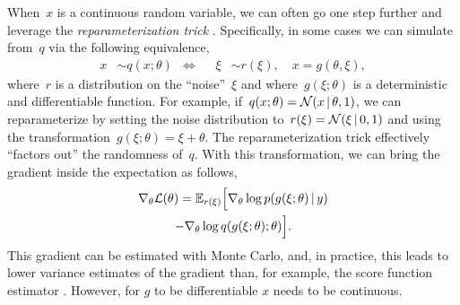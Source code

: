 \documentclass[twoside]{article}
\begin{document}
When~$x$ is a continuous random variable, we can often go one step
further and leverage the \emph{reparameterization trick}
\citep{Salimans2013, Kingma2014}.  Specifically, in some cases we can
simulate from~$q$ via the following equivalence,
\begin{align*}
  x &\sim q(x; \theta)
      & \iff & &  
  \xi &\sim r(\xi), \quad x = g(\theta, \xi),
\end{align*}
where~$r$ is a distribution on the ``noise''~$\xi$ and
where~$g(\xi; \theta)$ is a deterministic and differentiable
function. For example,
if~${q(x; \theta) = \mathcal{N}(x \, | \, \theta, 1)}$, we can
reparameterize by setting the noise distribution
to~${r(\xi) = \mathcal{N}(\xi \, | \, 0, 1)}$ and using the
transformation~${g(\xi; \theta) = \xi + \theta}$.  The
reparameterization trick effectively ``factors out'' the randomness
of~$q$. With this transformation, we can bring the gradient inside the
expectation as follows,
\begin{multline}
  \label{eq:elbo}
  \nabla_\theta \mathcal{L}(\theta) 
  = \mathbb{E}_{r(\xi)} \Big[ \nabla_\theta \log p(g(\xi; \theta) \, | \, y) \\
    - \nabla_\theta  \log q(g(\xi; \theta); \theta) \Big].
\end{multline}
This gradient can be estimated with Monte Carlo, and, in practice,
this leads to lower variance estimates of the gradient than, for
example, the score function estimator \citep{Williams1992, Glynn1990}.
However, for $g$ to be differentiable $x$ needs to be continuous.


\end{document}
